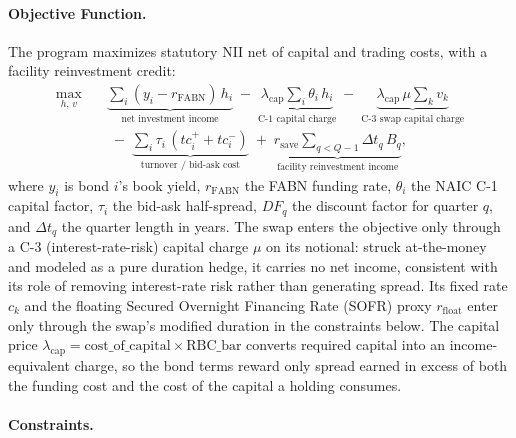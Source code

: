 \documentclass[12pt]{article}
\begin{document}
\paragraph{Objective Function.}

The program maximizes statutory NII net of capital and trading costs, with a facility reinvestment credit:
\begin{equation}
\begin{aligned}
\max_{h,\,v}\quad
& \underbrace{\sum_i (y_i - r_{\text{FABN}})\,h_i}_{\text{net investment income}}
\;-\; \underbrace{\lambda_{\text{cap}} \sum_i \theta_i\,h_i}_{\text{C-1 capital charge}}
\;-\; \underbrace{\lambda_{\text{cap}}\,\mu \sum_k v_k}_{\text{C-3 swap capital charge}} \\[4pt]
& \;-\; \underbrace{\sum_i \tau_i\,(tc^{+}_i + tc^{-}_i)}_{\text{turnover / bid-ask cost}}
\;+\; \underbrace{r_{\text{save}} \sum_{q<Q-1} \Delta t_q\,B_q}_{\text{facility reinvestment income}},
\end{aligned}
\end{equation}
where $y_i$ is bond $i$'s book yield, $r_{\text{FABN}}$ the FABN funding rate, $\theta_i$ the NAIC C-1 capital factor, $\tau_i$ the bid-ask half-spread, $DF_q$ the discount factor for quarter $q$, and $\Delta t_q$ the quarter length in years. The swap enters the objective only through a C-3 (interest-rate-risk) capital charge $\mu$ on its notional: struck at-the-money and modeled as a pure duration hedge, it carries no net income, consistent with its role of removing interest-rate risk rather than generating spread. Its fixed rate $c_k$ and the floating Secured Overnight Financing Rate (SOFR) proxy $r_{\text{float}}$ enter only through the swap's modified duration in the constraints below. The capital price $\lambda_{\text{cap}} = \text{cost\_of\_capital} \times \text{RBC\_bar}$ converts required capital into an income-equivalent charge, so the bond terms reward only spread earned in excess of both the funding cost and the cost of the capital a holding consumes.

\paragraph{Constraints.} 
\end{document}
